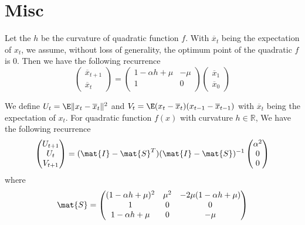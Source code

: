 \section{Misc}


\begin{lemma}
	Let the $h$ be the curvature of quadratic function $f$. With $\overline{x}_t$ being the expectation of $x_t$, we assume, without loss of generality, the optimum point of the quadratic $f$ is 0. Then we have the following recurrence
	\begin{equation} 
		\begin{pmatrix}
			\overline{x}_{t + 1} \\
			\overline{x}_t
		\end{pmatrix} = 
		\begin{pmatrix}
			1-\alpha h + \mu & - \mu\\
			1 & 0 \\
		\end{pmatrix}
		\begin{pmatrix}
			\overline{x}_1 \\
			\overline{x}_0
		\end{pmatrix}
	\end{equation} 
\end{lemma}

\begin{lemma}
	We define $U_t=\E \| x_t - \overline{x}_t \|^2$ and $V_t= \E (x_t - \overline{x}_t) (x_{t-1} - \overline{x}_{t-1})$ with $\overline{x}_t$ being the expectation of $x_t$. For quadratic function $f(x)$ with curvature $h \in \mathbb{R}$, We have the following recurrence
	\begin{equation} 
		\begin{pmatrix}
			U_{t+1} \\
			U_t \\
			V_{t + 1}
		\end{pmatrix} = 
		(\mat{I} - \mat{S}^T)(\mat{I} - \mat{S})^{-1}
		\begin{pmatrix}
			\alpha^2 \\
			0 \\
			0
		\end{pmatrix}
	\end{equation}
	where 
	\begin{equation}
		\mat{S} = 
		\begin{pmatrix}
		(1-\alpha h + \mu)^2 &  \mu^2 & -2\mu(1-\alpha h + \mu)\\
		1 & 0 & 0 \\
		1-\alpha h + \mu & 0 & - \mu
		\end{pmatrix}
	\end{equation}
\end{lemma}


